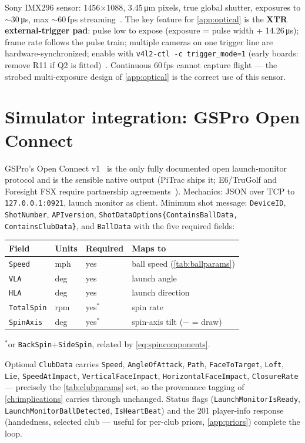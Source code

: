 Sony IMX296 sensor: 1456$\times$1088, 3.45\,\si{\micro\meter} pixels,
true global shutter, exposures to $\sim$30\,\si{\micro\second}, max
$\sim$60\,fps streaming~\cite{pigscam}. The key feature for
\cref{app:optical} is the \textbf{XTR external-trigger pad}: pulse low
to expose (exposure = pulse width + 14.26\,\si{\micro\second}); frame
rate follows the pulse train; multiple cameras on one trigger line are
hardware-synchronized; enable with
\texttt{v4l2-ctl -c trigger\_mode=1} (early boards: remove R11 if Q2
is fitted)~\cite{pigscam}. Continuous 60\,fps cannot capture flight ---
the strobed multi-exposure design of \cref{app:optical} is the correct
use of this sensor.

\section{Simulator integration: GSPro Open Connect}
\label{app:gspro}

GSPro's Open Connect v1~\cite{gspro} is the only fully documented open
launch-monitor protocol and is the sensible native output
(PiTrac ships it; E6/TruGolf and Foresight FSX require partnership
agreements~\cite{pitrac}). Mechanics: JSON over TCP to
\texttt{127.0.0.1:0921}, launch monitor as client. Minimum shot
message: \texttt{DeviceID}, \texttt{ShotNumber}, \texttt{APIversion},
\texttt{ShotDataOptions\{ContainsBallData, ContainsClubData\}}, and
\texttt{BallData} with the five required fields:
\begin{center}\small
\begin{tabular}{@{}llll@{}}
\toprule
Field & Units & Required & Maps to \\
\midrule
\texttt{Speed} & mph & yes & ball speed (\cref{tab:ballparams}) \\
\texttt{VLA} & deg & yes & launch angle \\
\texttt{HLA} & deg & yes & launch direction \\
\texttt{TotalSpin} & rpm & yes$^{*}$ & spin rate \\
\texttt{SpinAxis} & deg & yes$^{*}$ & spin-axis tilt ($-$ = draw) \\
\bottomrule
\end{tabular}

\smallskip
\footnotesize $^{*}$or \texttt{BackSpin}+\texttt{SideSpin}, related by
\cref{eq:spincomponents}.
\end{center}
Optional \texttt{ClubData} carries \texttt{Speed},
\texttt{AngleOfAttack}, \texttt{Path}, \texttt{FaceToTarget},
\texttt{Loft}, \texttt{Lie}, \texttt{SpeedAtImpact},
\texttt{VerticalFaceImpact}, \texttt{HorizontalFaceImpact},
\texttt{ClosureRate} --- precisely the \cref{tab:clubparams} set, so
the provenance tagging of \cref{ch:implications} carries through
unchanged. Status flags (\texttt{LaunchMonitorIsReady},
\texttt{LaunchMonitorBallDetected}, \texttt{IsHeartBeat}) and the
201 player-info response (handedness, selected club --- useful for
per-club priors, \cref{app:priors}) complete the loop.

